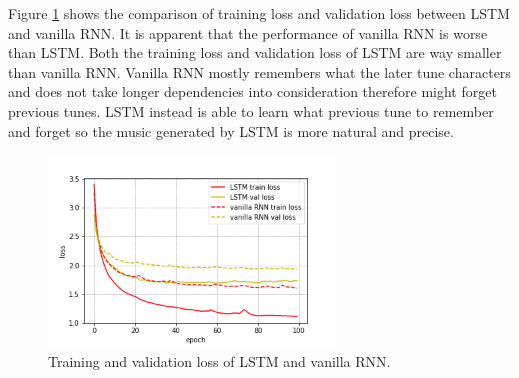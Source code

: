 \documentclass{article}
\begin{document}
Figure \ref{lstm vs vanilla} shows the comparison of training loss and validation loss between LSTM and vanilla RNN. It is apparent that the performance of vanilla RNN is worse than LSTM. Both the training loss and validation loss of LSTM are way smaller than vanilla RNN. Vanilla RNN mostly remembers what the later tune characters and does not take longer dependencies into consideration therefore might forget previous tunes. LSTM instead is able to learn what previous tune to remember and forget so the music generated by LSTM is more natural and precise.

\begin{figure}[H]
\begin{center}
  \centering
  \includegraphics[width=3in]{image/e_lstm_vanilla.png}
\end{center}
\caption{Training and validation loss of LSTM and vanilla RNN.}
\label{lstm vs vanilla}
\end{figure}
\end{document}
